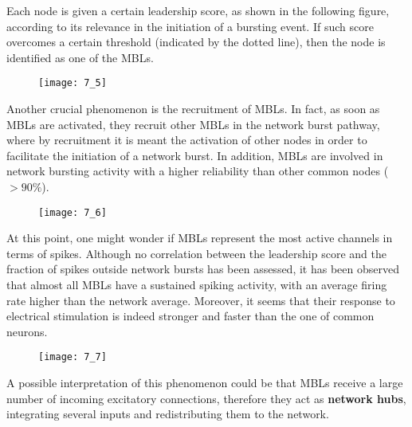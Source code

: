 Each node is given a certain leadership score, as shown in the following figure, according
to its relevance in the initiation of a bursting event. If such score overcomes a
certain threshold (indicated by the dotted line), then the node is identified as
one of the MBLs.
\begin{figure}[H]
    \texttt{[image: 7\_5]}
    \centering
\end{figure}
Another crucial phenomenon is the recruitment of MBLs. In fact,
as soon as MBLs are activated, they recruit other MBLs in the network burst pathway, where by recruitment it is meant
the activation of other nodes in order to facilitate the initiation of a network burst.
In addition, MBLs are involved in network bursting activity with a higher reliability
than other common nodes (\(>90\%\)).
\begin{figure}[H]
    \texttt{[image: 7\_6]}
    \centering
\end{figure}
At this point, one might wonder if MBLs represent the most active channels in terms
of spikes. Although no correlation between the leadership score and the fraction of
spikes outside network bursts has been assessed, it has been observed that almost
all MBLs have a sustained spiking activity, with an average firing rate higher than
the network average. Moreover, it seems that their response to electrical stimulation
is indeed stronger and faster than the one of common neurons.
\begin{figure}[H]
    \texttt{[image: 7\_7]}
    \centering
\end{figure}
A possible interpretation of this phenomenon could be that MBLs receive a large number
of incoming excitatory connections, therefore they act as \textbf{network hubs}, integrating
several inputs and redistributing them to the network.